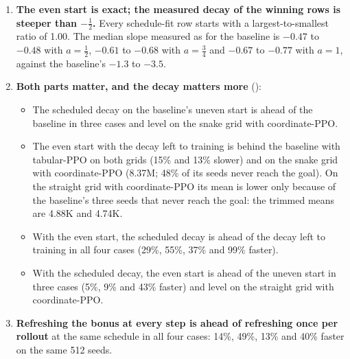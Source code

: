 \begin{enumerate}[leftmargin=*]
Tabular-PPO is faster with a faster decay and coordinate-PPO with a slower one. Against $a=1$ on
the same seeds (), $a=\tfrac34$ is 11\% and 24\% slower
with tabular-PPO, level on the straight grid with coordinate-PPO and 28\% faster on the snake
grid with coordinate-PPO; $a=\tfrac12$ is slower in three cases and level in the fourth. A
different count rate does not change the result at $a=\tfrac12$: in the screens, with the schedule
$(1+cm)^{-1/2}$ refreshed once per rollout and $c$ from 0.25 to 4, the snake grid with tabular-PPO
stays at 37.7K to 42.8K transitions against the baseline's 18.7K (32 seeds, a quarter of the
budget).
\item \textbf{The even start is exact; the measured decay of the winning rows is steeper than
$-\tfrac12$.} Every schedule-fit row starts with a largest-to-smallest ratio of 1.00. The median
slope measured as for the baseline is $-0.47$ to $-0.48$ with $a=\tfrac12$, $-0.61$ to $-0.68$
with $a=\tfrac34$ and $-0.67$ to $-0.77$ with $a=1$, against the baseline's $-1.3$ to $-3.5$.
\item \textbf{Both parts matter, and the decay matters more}
():
\begin{itemize}[leftmargin=*]
\item The scheduled decay on the baseline's uneven start is ahead of the baseline in three cases
and level on the snake grid with coordinate-PPO.
\item The even start with the decay left to training is behind the baseline with tabular-PPO on
both grids (15\% and 13\% slower) and on the snake grid with coordinate-PPO (8.37M; 48\% of its
seeds never reach the goal). On the straight grid with coordinate-PPO its mean is lower only
because of the baseline's three seeds that never reach the goal: the trimmed means are 4.88K and
4.74K.
\item With the even start, the scheduled decay is ahead of the decay left to training in all four
cases (29\%, 55\%, 37\% and 99\% faster).
\item With the scheduled decay, the even start is ahead of the uneven start in three cases (5\%,
9\% and 43\% faster) and level on the straight grid with coordinate-PPO.
\end{itemize}
\item \textbf{Refreshing the bonus at every step is ahead of refreshing once per rollout} at the
same schedule in all four cases: 14\%, 49\%, 13\% and 40\% faster on the same 512 seeds.

\end{enumerate}
